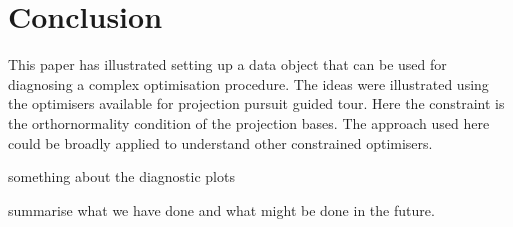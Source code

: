 \documentclass[12pt]{article}
\begin{document}
\hypertarget{conclusion}{%
\section{Conclusion}\label{conclusion}}

This paper has illustrated setting up a data object that can be used for diagnosing a complex optimisation procedure. The ideas were illustrated using the optimisers available for projection pursuit guided tour. Here the constraint is the orthornormality condition of the projection bases. The approach used here could be broadly applied to understand other constrained optimisers.

something about the diagnostic plots

summarise what we have done and what might be done in the future.

\clearpage



\end{document}
